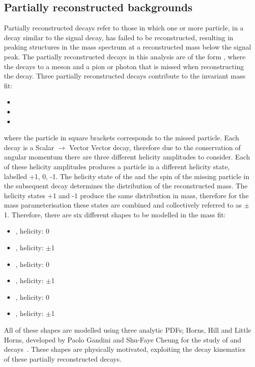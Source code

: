 \subsection{Partially reconstructed backgrounds}
\label{sec:massfit:partreco}

Partially reconstructed decays refer to those in which one or more particle, in a \B decay similar to the signal decay, has failed to be reconstructed, resulting in peaking structures in the \B mass spectrum at a reconstructed mass below the signal peak. The partially reconstructed decays in this analysis are of the form \decay{\B}{\Dstar\Kstar}, where the \Dstar decays to a \Dz meson and a pion or photon that is missed when reconstructing the decay. Three partially reconstructed decays contribute to the invariant mass fit:

\begin{itemize}
\item{\decay{\Bm}{(\decay{\Dstarz}{\Dz[\piz]})\Kstarm}}
\item{\decay{\Bm}{(\decay{\Dstarz}{\Dz[\gamma]})\Kstarm}}
\item{\decay{\Bd}{(\decay{\Dstarp}{\Dz[\pip]})\Kstarm}}
\end{itemize}
where the particle in square brackets corresponds to the missed particle. Each \decay{\B}{\Dstar\Kstar} decay is a Scalar $\to$ Vector Vector decay, therefore due to the conservation of angular momentum there are three different helicity amplitudes to consider. Each of these helicity amplitudes produces a \Dstar particle in a different helicity state, labelled +1, 0, -1. The helicity state of the \Dstar and the spin of the missing particle in the subsequent \Dstar decay determines the distribution of the reconstructed \B mass. The helicity states +1 and -1 produce the same distribution in \Bm mass, therefore for the mass parameterisation these states are combined and collectively referred to as $\pm$1. Therefore, there are six different shapes to be modelled in the mass fit:
\begin{itemize}
\item{\decay{\Bm}{(\decay{\Dstarz}{\Dz[\piz]})\Kstarm}, \Dstarz helicity: 0} 
\item{\decay{\Bm}{(\decay{\Dstarz}{\Dz[\piz]})\Kstarm}, \Dstarz helicity: $\pm$1} 
\item{\decay{\Bm}{(\decay{\Dstarz}{\Dz[\gamma]})\Kstarm}, \Dstarz helicity: 0}
\item{\decay{\Bm}{(\decay{\Dstarz}{\Dz[\gamma]})\Kstarm}, \Dstarz helicity: $\pm$1}
\item{\decay{\Bd}{(\decay{\Dstarp}{\Dz[\pip]})\Kstarm}, \Dstarp helicity: 0}
\item{\decay{\Bd}{(\decay{\Dstarp}{\Dz[\pip]})\Kstarm}, \Dstarp helicity: $\pm$1}
\end{itemize}
All of these shapes are modelled using three analytic PDFs; Horns, Hill and Little Horns, developed by Paolo Gandini and Shu-Faye Cheung for the study of  and \decay{\Bz}{\D\Kstarz} decays~\cite{LHCb-PAPER-2017-021,LHCb-PAPER-2016-006}. These shapes are physically motivated, exploiting the decay kinematics of these partially reconstructed decays.


